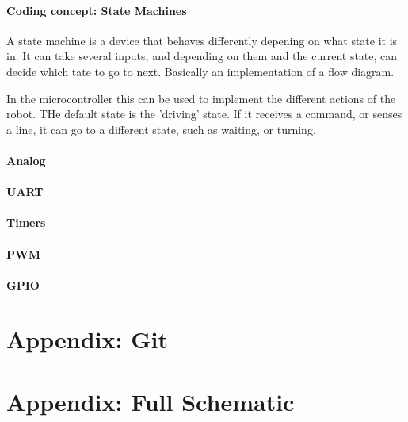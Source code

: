 \documentclass{article}
\begin{document}
\paragraph{Coding concept: State Machines}
A state machine is a device that behaves differently depening on what state it is in. It can take several inputs, and depending on them and the current state, can decide which tate to go to next. Basically an implementation of a flow diagram.

In the microcontroller this can be used to implement the different actions of the robot. THe default state is the 'driving' state. If it receives a command, or senses a line, it can go to a different state, such as waiting, or turning.

\paragraph{Analog}
\paragraph{UART}
\paragraph{Timers}
\paragraph{PWM}
\paragraph{GPIO}

\section{Appendix: Git}
\section{Appendix: Full Schematic}
\end{document}
